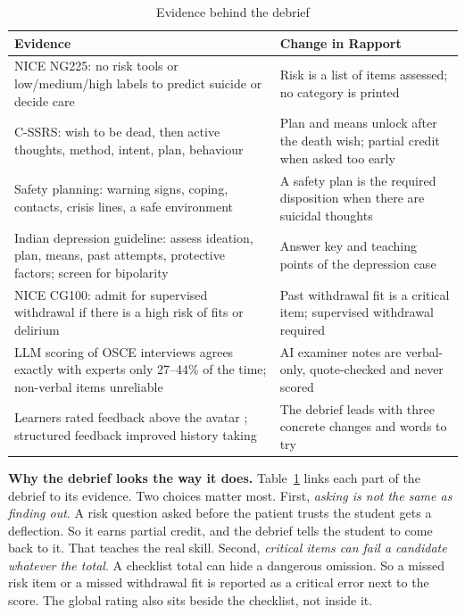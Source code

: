 \documentclass{article}
\begin{document}
\begin{table}[t]
\caption{Evidence behind the debrief}
\label{tab:debriefev}
\centering
\scriptsize
\begin{tabular}{ll}
\toprule
Evidence & Change in Rapport\\
\midrule
NICE NG225: no risk tools or low/medium/high labels to predict suicide or decide care \cite{nice2022ng225} & Risk is a list of items assessed;
no category is printed\\
C-SSRS: wish to be dead, then active thoughts, method, intent, plan, behaviour \cite{posner2011cssrs} & Plan and means unlock after the death
wish; partial credit when asked too early\\
Safety planning: warning signs, coping, contacts, crisis lines, a safe environment \cite{stanley2012safety} & A safety plan is the required
disposition when there are suicidal thoughts\\
Indian depression guideline: assess ideation, plan, means, past attempts, protective factors; screen for bipolarity
\cite{tripathi2026depression} & Answer key and teaching points of the depression case\\
NICE CG100: admit for supervised withdrawal if there is a high risk of fits or delirium \cite{nice2010cg100} & Past withdrawal fit is a critical item;
supervised withdrawal required\\
LLM scoring of OSCE interviews agrees exactly with experts only 27--44\% of the time; non-verbal items unreliable \cite{geathers2025benchmarking}
& AI examiner notes are verbal-only, quote-checked and never scored\\
Learners rated feedback above the avatar \cite{haut2025ai}; structured feedback improved history taking \cite{brugge2024llm} & The debrief leads
with three concrete changes and words to try\\
\bottomrule
\end{tabular}
\end{table}

\textbf{Why the debrief looks the way it does.} Table~\ref{tab:debriefev} links each part of the debrief to its evidence. Two choices matter
most. First, \emph{asking is not the same as finding out}. A risk question asked before the patient trusts the student gets a deflection. So it earns partial credit, and the debrief tells the student to come back to it. That teaches the real skill. Second, \emph{critical items can fail a candidate whatever the total}. A checklist total can hide a dangerous omission. So a missed risk item or a missed withdrawal fit is reported as a critical error next to the score. The global rating also sits beside the checklist, not inside it.
\end{document}
